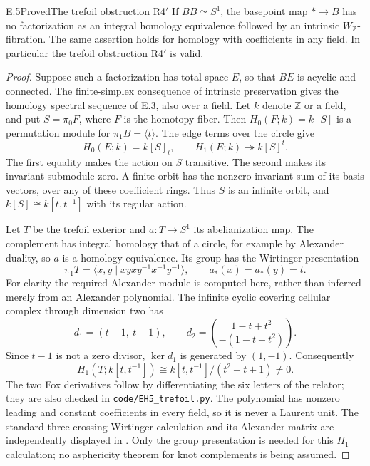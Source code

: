 \begin{claim}{E.5}{Proved}{The trefoil obstruction R4$'$}
If $BB\simeq S^1$, the basepoint map $*\to B$ has no factorization
as an integral homology equivalence followed by an intrinsic
$W_{\mathbb Z}$-fibration. The same assertion holds for homology
with coefficients in any field. In particular the trefoil
obstruction R4$'$ is valid.
\end{claim}
\begin{proof}
Suppose such a factorization has total space $E$, so that $BE$
is acyclic and connected. The finite-simplex consequence of
intrinsic preservation gives the homology spectral sequence
of E.3, also over a field. Let $k$ denote $\mathbb Z$ or a
field, and put $S=\pi_0F$, where $F$ is the homotopy fiber.
Then $H_0(F;k)=k[S]$ is a permutation module for
$\pi_1B=\langle t\rangle$. The edge terms over the circle give
\[
 H_0(E;k)=k[S]_{t},\qquad
 H_1(E;k)\twoheadrightarrow k[S]^{t}.                    \tag{E.5.1}
\]
The first equality makes the action on $S$ transitive. The
second makes its invariant submodule zero. A finite orbit
has the nonzero invariant sum of its basis vectors, over any
of these coefficient rings. Thus $S$ is an infinite orbit,
and $k[S]\cong k[t,t^{-1}]$ with its regular action.

Let $T$ be the trefoil exterior and $a:T\to S^1$ its
abelianization map. The complement has integral homology
that of a circle, for example by Alexander duality, so $a$
is a homology equivalence. Its group has the Wirtinger
presentation
\[
 \pi_1T=\langle x,y\mid xyxy^{-1}x^{-1}y^{-1}\rangle,
 \qquad a_*(x)=a_*(y)=t.
\]
For clarity the required Alexander module is computed here,
rather than inferred merely from an Alexander polynomial.
The infinite cyclic covering cellular complex through
dimension two has
\[
 d_1=(t-1,\ t-1),\qquad
 d_2=\binom{1-t+t^2}{-(1-t+t^2)}.
\]
Since $t-1$ is not a zero divisor, $\ker d_1$ is generated
by $(1,-1)$. Consequently
\[
 H_1(T;k[t,t^{-1}])
       \cong k[t,t^{-1}]/(t^2-t+1)\ne0.                 \tag{E.5.2}
\]
The two Fox derivatives follow by differentiating the six
letters of the relator; they are also checked in
\texttt{code/EH5\_trefoil.py}. The polynomial has nonzero
leading and constant coefficients in every field, so it is
never a Laurent unit. The standard three-crossing Wirtinger
calculation and its Alexander matrix are independently
displayed in \citet[Example 2.35]{EH5KnotNotes2018}.
Only the group presentation is needed for this $H_1$
calculation; no asphericity theorem for knot complements
is being assumed.


\end{proof}

